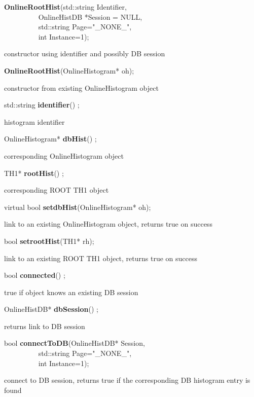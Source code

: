 \item    {\bf OnlineRootHist}(std::string Identifier,\\\mbox{}~~~~~~~~~
		 OnlineHistDB *Session = NULL,\\\mbox{}~~~~~~~~~
		 std::string Page="\_NONE\_",\\\mbox{}~~~~~~~~~
		 int Instance=1);

 constructor using identifier and possibly DB session


\item    {\bf OnlineRootHist}(OnlineHistogram*  oh);


 constructor from existing OnlineHistogram object


\item    std::string {\bf identifier}()  ;

 histogram identifier


\item    OnlineHistogram* {\bf dbHist}() ;

 corresponding OnlineHistogram object


\item    TH1* {\bf rootHist}() ;

 corresponding ROOT TH1 object


\item    virtual bool {\bf setdbHist}(OnlineHistogram*  oh);


 link to an existing OnlineHistogram object, returns true on success


\item    bool {\bf setrootHist}(TH1*  rh);


 link to an existing ROOT TH1 object, returns true on success


\item    bool {\bf connected}() ;

 true if object knows an existing DB session


\item    OnlineHistDB* {\bf dbSession}() ;

 returns link to DB session


\item    bool {\bf connectToDB}(OnlineHistDB* Session,\\\mbox{}~~~~~~~~~
		   std::string Page="\_NONE\_",\\\mbox{}~~~~~~~~~
		   int Instance=1);

 connect to DB session, returns true if the corresponding DB histogram entry is found


